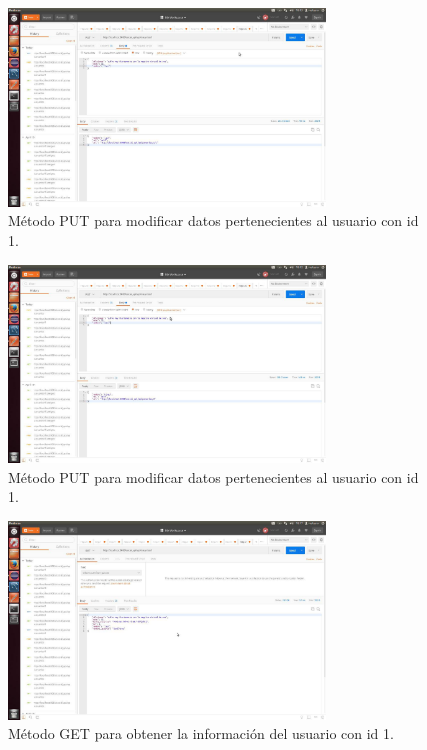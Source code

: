 \documentclass[12pt,a4paper, spanish]{article}
\begin{document}
\begin{figure}[H]
	\centering
	\includegraphics[width=0.75\textwidth]{images/captura12.jpg}
	\caption{Método PUT para modificar datos pertenecientes al usuario con id 1.}
\end{figure}

\begin{figure}[H]
	\centering
	\includegraphics[width=0.75\textwidth]{images/captura13.jpg}
	\caption{Método PUT para modificar datos pertenecientes al usuario con id 1.}
\end{figure}

\begin{figure}[H]
	\centering
	\includegraphics[width=0.75\textwidth]{images/captura14.jpg}
	\caption{Método GET para obtener la información del usuario con id 1.}
\end{figure}
\end{document}
